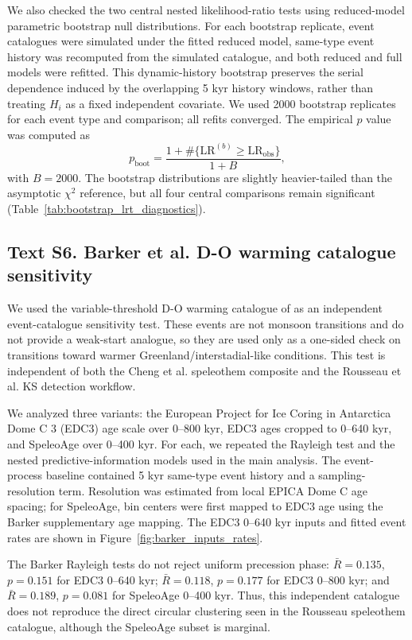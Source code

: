 \documentclass[11pt]{article}
\begin{document}
We also checked the two central nested likelihood-ratio tests using reduced-model parametric bootstrap null distributions. For each bootstrap replicate, event catalogues were simulated under the fitted reduced model, same-type event history was recomputed from the simulated catalogue, and both reduced and full models were refitted. This dynamic-history bootstrap preserves the serial dependence induced by the overlapping 5 kyr history windows, rather than treating \(H_i\) as a fixed independent covariate. We used 2000 bootstrap replicates for each event type and comparison; all refits converged. The empirical \(p\) value was computed as
\[
p_{\mathrm{boot}}=
\frac{1+\#\{\mathrm{LR}^{(b)}\geq \mathrm{LR}_{\mathrm{obs}}\}}
{1+B},
\]
with \(B=2000\). The bootstrap distributions are slightly heavier-tailed than the asymptotic \(\chi^2\) reference, but all four central comparisons remain significant (Table~\ref{tab:bootstrap_lrt_diagnostics}).

\subsection*{Text S6. Barker et al. D-O warming catalogue sensitivity}

We used the variable-threshold D-O warming catalogue of \citet{barker2011800} as an independent event-catalogue sensitivity test. These events are not monsoon transitions and do not provide a weak-start analogue, so they are used only as a one-sided check on transitions toward warmer Greenland/interstadial-like conditions. This test is independent of both the Cheng et al. speleothem composite and the Rousseau et al. KS detection workflow.

We analyzed three variants: the European Project for Ice Coring in Antarctica Dome C 3 (EDC3) age scale over 0--800 kyr, EDC3 ages cropped to 0--640 kyr, and SpeleoAge over 0--400 kyr. For each, we repeated the Rayleigh test and the nested predictive-information models used in the main analysis. The event-process baseline contained 5 kyr same-type event history and a sampling-resolution term. Resolution was estimated from local EPICA Dome C age spacing; for SpeleoAge, bin centers were first mapped to EDC3 age using the Barker supplementary age mapping. The EDC3 0--640 kyr inputs and fitted event rates are shown in Figure~\ref{fig:barker_inputs_rates}.

The Barker Rayleigh tests do not reject uniform precession phase: \(\bar{R}=0.135\), \(p=0.151\) for EDC3 0--640 kyr; \(\bar{R}=0.118\), \(p=0.177\) for EDC3 0--800 kyr; and \(\bar{R}=0.189\), \(p=0.081\) for SpeleoAge 0--400 kyr. Thus, this independent catalogue does not reproduce the direct circular clustering seen in the Rousseau speleothem catalogue, although the SpeleoAge subset is marginal.
\end{document}
